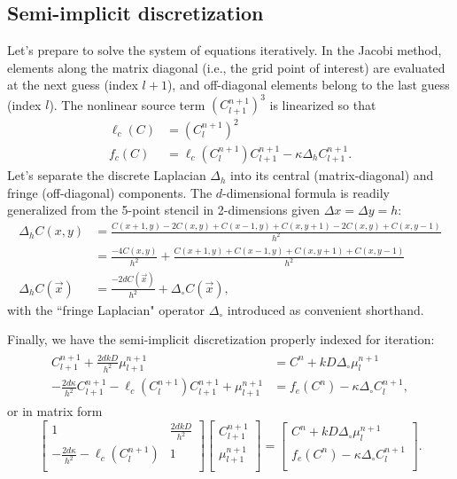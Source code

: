 	\subsection{Semi-implicit discretization}
	Let's prepare to solve the system of equations iteratively.
	In the Jacobi method, elements along the matrix diagonal (i.e., the grid point of interest) are evaluated at
	the next guess (index $l+1$), and off-diagonal elements belong to the last guess (index $l$).
	The nonlinear source term $\left(C_{l+1}^{n+1}\right)^3$ is linearized so that
	\begin{align*}
		\ell_c(C) &= \left(C_l^{n+1}\right)^2\\
		f_c(C) &= \ell_c(C_l^{n+1})C_{l+1}^{n+1} - \kappa\Delta_hC_{l+1}^{n+1}.
	\end{align*}
	Let's separate the discrete Laplacian $\Delta_h$ into its central (matrix-diagonal) and fringe (off-diagonal) components. The $d$-dimensional
	formula is readily generalized from the 5-point stencil in 2-dimensions given $\Delta x=\Delta y=h$:
	\begin{align*}
		\Delta_hC(x,y)	&= \frac{C(x+1,y)-2C(x,y)+C(x-1,y)+C(x,y+1)-2C(x,y)+C(x,y-1)}{h^2}\\
						&= \frac{-4C(x,y)}{h^2}+\frac{C(x+1,y)+C(x-1,y)+C(x,y+1)+C(x,y-1)}{h^2}\\
		\Delta_hC(\vec{x})	&= \frac{-2dC(\vec{x})}{h^2} + \Delta_\circ C(\vec{x}),
	\end{align*}
	with the ``fringe Laplacian" operator $\Delta_\circ$ introduced as convenient shorthand.

	Finally, we have the semi-implicit discretization properly indexed for iteration:
	\begin{align}
	\begin{split}
		C_{l+1}^{n+1} + \frac{2dkD}{h^2}\mu_{l+1}^{n+1} &= C^n + kD\Delta_\circ\mu_l^{n+1}\\
		-\frac{2d\kappa}{h^2}C_{l+1}^{n+1} - \ell_c(C_l^{n+1})C_{l+1}^{n+1} + \mu_{l+1}^{n+1} &= f_e(C^n) - \kappa\Delta_\circ C_l^{n+1},
	\end{split}
	\label{eqn:jacobieom}
	\end{align}
	or in matrix form
	\[
		\begin{bmatrix}
			1	&	\frac{2dkD}{h^2}\\[0.5em]
			-\frac{2d\kappa}{h^2} - \ell_c\left(C_l^{n+1}\right) & 1\\
		\end{bmatrix}
		\begin{bmatrix}
			C_{l+1}^{n+1} \\[0.5em]
			\mu_{l+1}^{n+1}\\
		\end{bmatrix}
		=
		\begin{bmatrix}
			C^n + kD\Delta_\circ\mu_l^{n+1}\\[0.5em]
			f_e(C^n) - \kappa\Delta_\circ C_l^{n+1}\\
		\end{bmatrix}.
	\]

